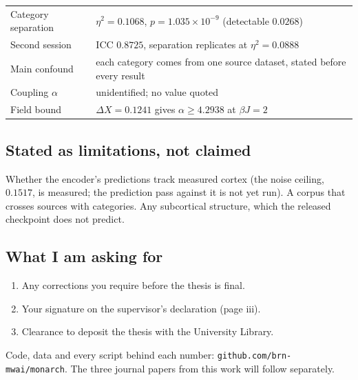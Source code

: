 \documentclass[11pt,a4paper]{article}
\begin{document}
\begin{center}
\begin{tabular}{@{}ll@{}}
\toprule
Category separation & $\eta^2 = 0.1068$, $p = 1.035\times10^{-9}$ (detectable $0.0268$) \\
Second session & ICC $0.8725$, separation replicates at $\eta^2 = 0.0888$ \\
Main confound & each category comes from one source dataset, stated before every result \\
Coupling $\alpha$ & unidentified; no value quoted \\
Field bound & $\Delta X = 0.1241$ gives $\alpha \ge 4.2938$ at $\beta J = 2$ \\
\bottomrule
\end{tabular}
\end{center}

\subsection*{Stated as limitations, not claimed}

Whether the encoder's predictions track measured cortex (the noise ceiling, $0.1517$, is
measured; the prediction pass against it is not yet run). A corpus that crosses sources with
categories. Any subcortical structure, which the released checkpoint does not predict.

\subsection*{What I am asking for}

\begin{enumerate}[leftmargin=*]
\item Any corrections you require before the thesis is final.
\item Your signature on the supervisor's declaration (page iii).
\item Clearance to deposit the thesis with the University Library.
\end{enumerate}

\vspace{4pt}
\noindent Code, data and every script behind each number: \texttt{github.com/brn-mwai/monarch}.
The three journal papers from this work will follow separately.
\end{document}
